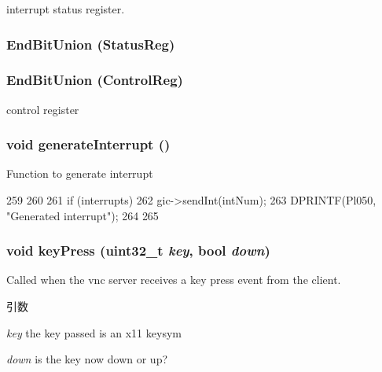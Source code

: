 \label{classPl050_a429076a6961a34396291ae1f31258c78}
interrupt status register. \hypertarget{classPl050_aa9e28741f3f4858715bb5d4147fd5b02}{
\subsubsection[{EndBitUnion}]{\setlength{\rightskip}{0pt plus 5cm}EndBitUnion (StatusReg)}}
\label{classPl050_aa9e28741f3f4858715bb5d4147fd5b02}
\hypertarget{classPl050_ae5769101277017b333eb93fb1bd4241e}{
\subsubsection[{EndBitUnion}]{\setlength{\rightskip}{0pt plus 5cm}EndBitUnion (ControlReg)}}
\label{classPl050_ae5769101277017b333eb93fb1bd4241e}
control register \hypertarget{classPl050_ab251ef5c4d9e1f0239542a9d8aa0dc3e}{
\subsubsection[{generateInterrupt}]{\setlength{\rightskip}{0pt plus 5cm}void generateInterrupt ()}}
\label{classPl050_ab251ef5c4d9e1f0239542a9d8aa0dc3e}
Function to generate interrupt 


\begin{DoxyCode}
259 {
260 
261     if (interrupts) {
262         gic->sendInt(intNum);
263         DPRINTF(Pl050, "Generated interrupt\n");
264     }
265 }
\end{DoxyCode}
\hypertarget{classPl050_a24207a2cfb1351040a29bc3a1e341e42}{
\subsubsection[{keyPress}]{\setlength{\rightskip}{0pt plus 5cm}void keyPress ({\bf uint32\_\-t} {\em key}, \/  bool {\em down})}}
\label{classPl050_a24207a2cfb1351040a29bc3a1e341e42}
Called when the vnc server receives a key press event from the client. 
\begin{DoxyParams}{引数}
\item[{\em key}]the key passed is an x11 keysym \item[{\em down}]is the key now down or up? \end{DoxyParams}


